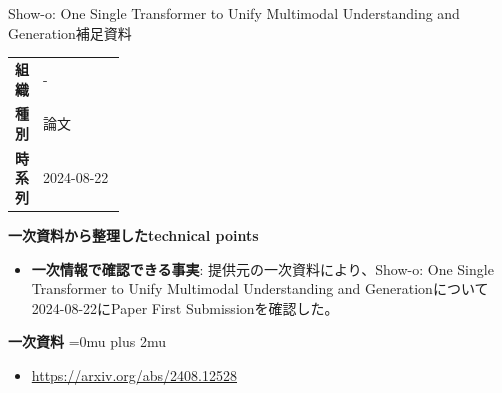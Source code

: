 \begin{technicalnote}{Show-o: One Single Transformer to Unify Multimodal Understanding and Generation}{補足資料}
\begingroup
\begin{tabularx}{\linewidth}{@{}>{\bfseries}p{0.22\linewidth}X@{}}
組織 & - \\
種別 & 論文 \\
時系列 & 2024-08-22 \\
\end{tabularx}
\smallskip
{\bfseries 一次資料から整理したtechnical points}
\begin{itemize}[leftmargin=1.5em,itemsep=0.35em]
\item \textbf{一次情報で確認できる事実}: 提供元の一次資料により、Show-o: One Single Transformer to Unify Multimodal Understanding and Generationについて2024-08-22にPaper First Submissionを確認した。
\end{itemize}
\begin{minipage}{\linewidth}
\begin{samepage}
{\bfseries 一次資料}
\begingroup\sloppy
\Urlmuskip=0mu plus 2mu\relax
\begin{itemize}[leftmargin=1.5em,itemsep=0.25em]
\item {\scriptsize\url{https://arxiv.org/abs/2408.12528}}
\end{itemize}
\endgroup
\end{samepage}
\end{minipage}
\endgroup
\end{technicalnote}
\medskip

